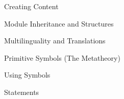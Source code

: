 \begin{sfragment}{Creating \sTeX Content}
\begin{sfragment}{Module Inheritance and Structures}
\begin{sfragment}{Multilinguality and Translations}
    \end{sfragment}

    
    
  \end{sfragment}

  \begin{sfragment}{Primitive Symbols (The \sTeX Metatheory)}
    
  \end{sfragment}
  
\end{sfragment}

\begin{sfragment}[id=sec.textsymbols]{Using \sTeX Symbols}
  
  
\end{sfragment}

\begin{sfragment}{\sTeX Statements}
  
  
\end{sfragment}


